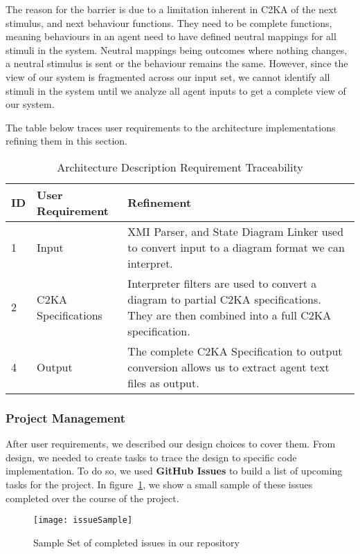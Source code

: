 The reason for the barrier is due to a limitation inherent in C2KA of the next stimulus, and next behaviour functions.
They need to be complete functions,
meaning behaviours in an agent need to have defined neutral mappings for all stimuli in the system.
Neutral mappings being outcomes where nothing changes, a neutral stimulus is sent or the behaviour remains the same.
However, since the view of our system is fragmented across our input set,
we cannot identify all stimuli in the system until we analyze all agent inputs to get a complete view of our system.


The table below traces user requirements to the architecture implementations refining them in this section.
\begin{table}[htbp]
    \centering
    \caption{Architecture Description Requirement Traceability}\label{tab:arch-description-table}
    \begin{tabularx}{\textwidth}{| l | l | X |}
        \hline
        \textbf{ID} & \textbf{User Requirement} & \textbf{Refinement} \\
        \hline
        1 & Input & XMI Parser, and State Diagram Linker used to convert input to a diagram format we can interpret. \\ \hline
        2 & C2KA Specifications & Interpreter filters are used to convert a diagram to partial C2KA specifications.
        They are then combined into a full C2KA specification. \\ \hline
        4 & Output & The complete C2KA Specification to output conversion allows us to extract agent text files as output.  \\ \hline
    \end{tabularx}
\end{table}

\newpage
\subsubsection{Project Management}\label{subsubsec:proj-mngmnt}
After user requirements, we described our design choices to cover them.
From design, we needed to create tasks to trace the design to specific code implementation.
To do so, we used \textbf{GitHub Issues} to build a list of upcoming tasks for the project.
In figure~\ref{fig:sampleIssueList}, we show a small sample of these issues completed over the course of the project.
\begin{figure}[ht]
    \centering
    \texttt{[image: issueSample]}
    \caption{Sample Set of completed issues in our repository}
    \label{fig:sampleIssueList}
\end{figure}

